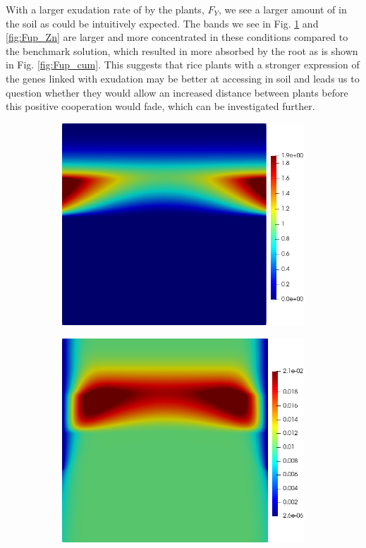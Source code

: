 \documentclass[11pt]{article}
\numberwithin{equation}{section}
\begin{document}
With a larger exudation rate of  by the plants, $F_Y$, we see a larger amount of  in the soil as could be intuitively expected. The bands we see in Fig. \ref{fig:Fup_DMA} and \ref{fig:Fup_Zn} are larger and more concentrated in these conditions compared to the benchmark solution, which resulted in more  absorbed by the root as is shown in Fig. \ref{fig:Fup_cum}. This suggests that rice plants with a stronger expression of the genes linked with  exudation may be better at accessing  in soil and leads us to question whether they would allow an increased distance between plants before this positive cooperation would fade, which can be investigated further.
 \begin{figure}[h]
     \centering
     \begin{subfigure}[t]{0.31\textwidth}
     \includegraphics[width=\textwidth]{Figures/testpics/IncreasedBufferDMA24.png} 
     \caption{}
     \label{fig:Fup_DMA}
     \end{subfigure}
     \begin{subfigure}[t]{0.31\textwidth}
     \includegraphics[width=\textwidth]{Figures/testpics/IncreasedBufferZn24.png}

\end{subfigure}
\end{figure}
\end{document}
